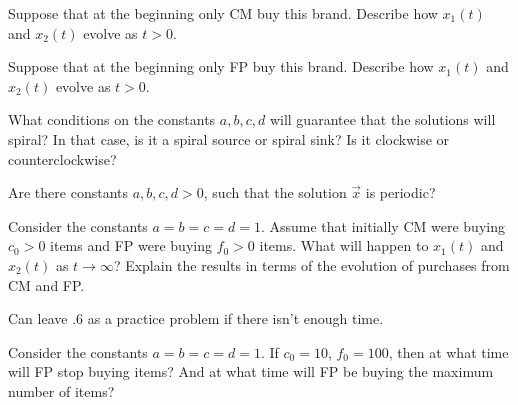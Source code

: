 	\begin{parts}
		\item Suppose that at the beginning only CM buy this brand. Describe how $x_1(t)$ and $x_2(t)$ evolve as $t>0$.


		\item Suppose that at the beginning only FP buy this brand. Describe how $x_1(t)$ and $x_2(t)$ evolve as $t>0$.


		\item What conditions on the constants $a,b,c,d$ will guarantee that the solutions will spiral? In that case, is it a spiral source or spiral sink? Is it clockwise or counterclockwise?
		\item Are there constants $a,b,c,d>0$, such that the solution $\vec{x}$ is periodic?
		\item Consider the constants $a=b=c=d=1$. Assume that initially CM were buying $c_0>0$ items and FP were buying $f_0>0$ items.
			What will happen to $x_1(t)$ and $x_2(t)$ as $t \to \infty$? Explain the results in terms of the evolution of purchases from CM and FP.
\begin{annotation}
	\begin{goals}
		Can leave .6 as a practice problem if there isn't enough time.
	\end{goals}
\end{annotation}
		\item Consider the constants $a=b=c=d=1$.  If $c_0=10$, $f_0=100$, then at what time will FP stop buying items? And at what time will FP be buying the maximum number of items?
	
	\end{parts}




\bookonlynewpage


\hfill

\bookonlynewpage
\standardonlynewpage
